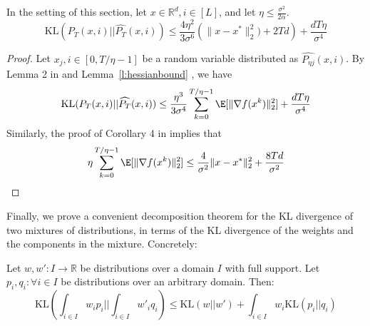 \begin{lem} In the setting of this section, let $x \in \mathbb{R}^d, i \in [L]$, and let $\eta \leq \frac{\sigma^2}{2 \alpha}$.
$$\mbox{KL}(P_T(x, i) || \widehat{P_T}(x,i)) \leq \frac{4 \eta^2 }{3 \sigma^6} \left(\|x - x^*\|_2^2) + 2 Td\right) + \frac{d T \eta}{\sigma^4}$$

\label{l:intervaldrift}
\end{lem}    
\begin{proof}
Let $x_j, i \in [0, T/\eta - 1]$ be a random variable distributed as $\widehat{P_{\eta j}}(x,i)$. By Lemma 2 in \cite{dalalyan2016theoretical} and Lemma~\ref{l:hessianbound}
, we have 
\begin{equation*} \mbox{KL}(P_T(x, i) || \widehat{P_T}(x,i)) \leq \frac{\eta^3}{3 \sigma^4} \sum_{k=0}^{T/\eta - 1} \E[\|\nabla f(x^k)\|^2_2] + \frac{d T \eta}{\sigma^4} \end{equation*}
Similarly, the proof of Corollary 4 in \cite{dalalyan2016theoretical} implies that%
\begin{equation*} \eta \sum_{k=0}^{T/\eta -1} \E[\|\nabla f(x^k)\|^2_2] \leq \frac{4}{\sigma^2} \|x - x^*\|^2_2 + \frac{8 T d}{\sigma^2}\end{equation*}

\end{proof} 

Finally, we prove a convenient decomposition theorem for the KL divergence of two mixtures of distributions, in terms of the KL divergence of the weights and the components in the mixture. Concretely:

\begin{lem} Let $w, w': I \to \mathbb{R}$ be distributions over a domain $I$ with full support. Let $p_i, q_i: \forall i \in I$ be distributions over an arbitrary domain. Then: 
$$ \mbox{KL}\left(\int_{i \in I} w_i p_i || \int_{i \in I} w'_i q_i\right) \leq \mbox{KL}(w || w') + \int_{i \in I} w_i \mbox{KL}(p_i || q_i) $$ 
\label{l:decomposingKL}
\end{lem} 

